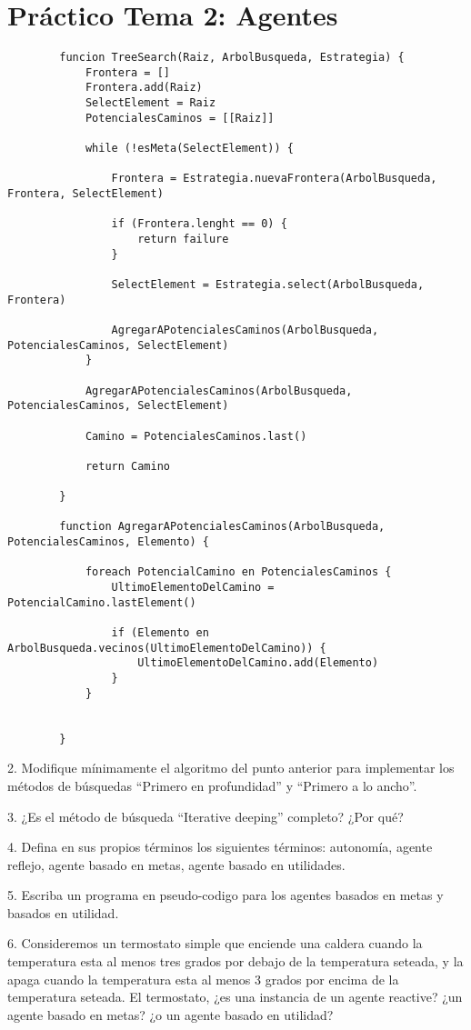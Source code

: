 \chapter{Práctico Tema 2: Agentes}


\begin{center}
	\begin{lstlisting}
		funcion TreeSearch(Raiz, ArbolBusqueda, Estrategia) {
			Frontera = []
			Frontera.add(Raiz)
			SelectElement = Raiz
			PotencialesCaminos = [[Raiz]]
			
			while (!esMeta(SelectElement)) {
				
				Frontera = Estrategia.nuevaFrontera(ArbolBusqueda, Frontera, SelectElement)
				
				if (Frontera.lenght == 0) {
					return failure
				}
				
				SelectElement = Estrategia.select(ArbolBusqueda, Frontera)
				
				AgregarAPotencialesCaminos(ArbolBusqueda, PotencialesCaminos, SelectElement)
			}
		
			AgregarAPotencialesCaminos(ArbolBusqueda, PotencialesCaminos, SelectElement)
		
			Camino = PotencialesCaminos.last()
		
			return Camino
			
		}
	
		function AgregarAPotencialesCaminos(ArbolBusqueda, PotencialesCaminos, Elemento) {
			
			foreach PotencialCamino en PotencialesCaminos {
				UltimoElementoDelCamino = PotencialCamino.lastElement()
				
				if (Elemento en ArbolBusqueda.vecinos(UltimoElementoDelCamino)) {
					UltimoElementoDelCamino.add(Elemento)
				}
			}
				
			
		}
	\end{lstlisting}
\end{center}

2. Modifique mínimamente el algoritmo del punto anterior para implementar los métodos de búsquedas “Primero en profundidad” y “Primero a lo ancho”.

3. ¿Es el método de búsqueda “Iterative deeping” completo? ¿Por qué?

4. Defina en sus propios términos los siguientes términos: autonomía, agente reflejo, agente basado en metas, agente basado en utilidades.

5. Escriba un programa en pseudo-codigo para los agentes basados en metas y basados en utilidad.

6. Consideremos un termostato simple que enciende una caldera cuando la temperatura esta al menos tres grados por debajo de la temperatura seteada, y la apaga cuando la temperatura esta al menos 3 grados por encima de la temperatura seteada. El termostato, ¿es una instancia de un agente reactive? ¿un agente basado en metas? ¿o un agente basado en utilidad?\textbf{}

\bigskip